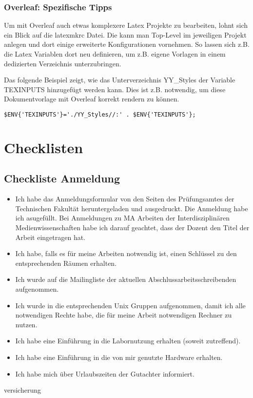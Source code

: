 \subsection{Overleaf: Spezifische Tipps}

Um mit Overleaf auch etwas komplexere Latex Projekte zu bearbeiten, lohnt sich ein Blick auf die latexmkrc Datei. Die kann man Top-Level im jeweiligen Projekt anlegen und dort einige erweiterte Konfigurationen vornehmen. So lassen sich z.B. die Latex Variablen dort neu definieren, um z.B. eigene Vorlagen in einem dedizierten Verzeichnis unterzubringen.

Das folgende Beispiel zeigt, wie das Unterverzeichnis YY\_Styles der Variable TEXINPUTS hinzugefügt werden kann. Dies ist z.B. notwendig, um diese Dokumentvorlage mit Overleaf korrekt rendern zu können.
\begin{verbatim}
$ENV{'TEXINPUTS'}='./YY_Styles//:' . $ENV{'TEXINPUTS'}; 
\end{verbatim}

\cleardoublepage

\chapter{Checklisten}

\section{Checkliste Anmeldung}

\begin{itemize}
\item Ich habe das Anmeldungsformular von den Seiten des Prüfungsamtes der Technischen Fakultät heruntergeladen und ausgedruckt. Die Anmeldung habe ich asugefüllt. Bei Anmeldungen zu MA Arbeiten der Interdisziplinären Medienwissenschaften habe ich darauf geachtet, dass der Dozent den Titel der Arbeit eingetragen hat.
\item Ich habe, falls es für meine Arbeiten notwendig ist, einen Schlüssel zu den entsprechenden Räumen erhalten.
\item Ich wurde auf die Mailingliste der aktuellen Abschlussarbeitsschreibenden aufgenommen.
\item Ich wurde in die entsprechenden Unix Gruppen aufgenommen, damit ich alle notwendigen Rechte habe, die für meine Arbeit notwendigen Rechner zu nutzen.
\item Ich habe eine Einführung in die Labornutzung erhalten (soweit zutreffend).
\item Ich habe eine Einführung in die von mir genutzte Hardware erhalten.
\item Ich habe mich über Urlaubszeiten der Gutachter informiert.
\end{itemize}

\cleardoublepage

{versicherung}